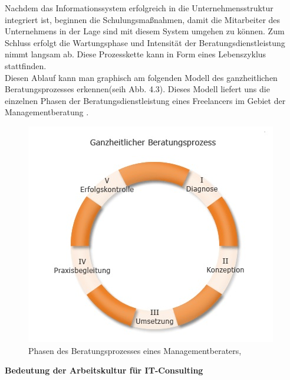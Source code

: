 	Nachdem das Informationssystem erfolgreich in die Unternehmensstruktur integriert ist, beginnen die Schulungsmaßnahmen, damit die Mitarbeiter des Unternehmens in der Lage sind mit diesem System umgehen zu können. Zum Schluss erfolgt die Wartungsphase und Intensität der Beratungsdienstleistung nimmt langsam ab. Diese Prozesskette kann in Form eines Lebenszyklus stattfinden.\\
	Diesen Ablauf kann man graphisch am folgenden Modell des ganzheitlichen Beratungsprozesses erkennen(seih Abb. 4.3). Dieses Modell liefert uns die einzelnen Phasen der Beratungsdienstleistung eines Freelancers im Gebiet der Managementberatung \cite{MngmBerPhasen}.


\begin{figure}[htp]
\centering
\includegraphics[width=0.7\linewidth]{./images/beratungsproz}
\caption{Phasen des Beratungsprozesses  eines Managementberaters, \cite{PhasenBeratungsprozess} }
\label{fig:beratungsproz}
\end{figure}
	
	\textbf{ Bedeutung der Arbeitskultur für IT-Consulting}\\ \\

